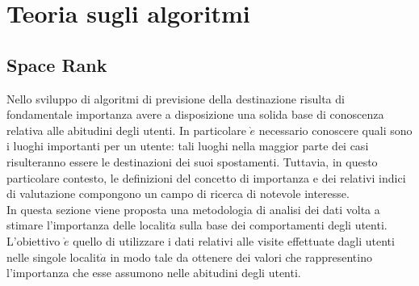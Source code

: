\chapter{Teoria sugli algoritmi}

\section{Space Rank}
Nello sviluppo di algoritmi di previsione della destinazione risulta di fondamentale
importanza avere a disposizione una solida base di conoscenza relativa alle
abitudini degli utenti. In particolare $\grave{e}$ necessario conoscere quali sono i luoghi
importanti per un utente: tali luoghi nella maggior parte dei casi risulteranno
essere le destinazioni dei suoi spostamenti. Tuttavia, in questo particolare
contesto, le definizioni del concetto di importanza e dei relativi indici di valutazione
compongono un campo di ricerca di notevole interesse.\\
In questa sezione viene proposta una metodologia di analisi dei dati volta
a stimare l'importanza delle localit$\grave{a}$ sulla base dei comportamenti degli utenti.
L'obiettivo $\grave{e}$ quello di utilizzare i dati relativi alle visite effettuate dagli utenti
nelle singole localit$\grave{a}$ in modo tale da ottenere dei valori che rappresentino
l'importanza che esse assumono nelle abitudini degli utenti.

